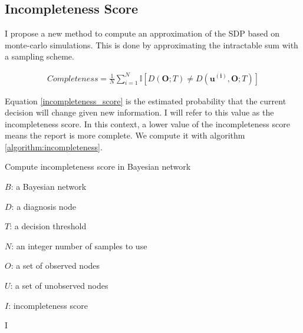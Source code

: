 \subsection{Incompleteness Score}
I propose a new method to compute an approximation of the SDP based on monte-carlo simulations. This is done by approximating the intractable sum with a sampling scheme.

\begin{align}
\label{incompleteness_score}
Completeness = \frac{1}{N}\sum_{i =1 }^{N}\mathbb{I}\left[D(\mathbf{O};T) \neq D(\mathbf{u^{(i)}},\mathbf{O};T)\right]
\end{align}

Equation \ref{incompleteness_score} is the estimated probability that the current decision will change given new information. I will refer to this value as the incompleteness score. In this context, a lower value of the incompleteness score means the report is more complete. We compute it with algorithm \ref{algorithm:incompleteness}.


\begin{algorithm}[h]
	\caption{Compute incompleteness score in Bayesian network}
	\label{algorithm:incompleteness}
	\begin{algorithmic}
		\Require
		
		$ B $: a Bayesian network
		
		$ D $: a diagnosis node
		
		$ T $: a decision threshold
		
		$ N $: an integer number of samples to use
		
		$ O $: a set of observed nodes
		
		$ U $: a set of unobserved nodes
		
		\Ensure $ I $: incompleteness score
		
		
		
		
			
			
			\EndIf
		\EndFor
		\State \Return I
		\EndFunction
		
	\end{algorithmic}
\end{algorithm}


